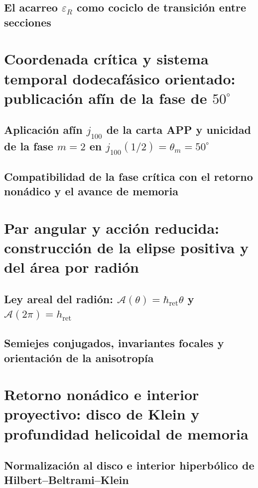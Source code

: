 \subsection{El acarreo \(\varepsilon_R\) como cociclo de transición entre secciones}


\section{Coordenada crítica y sistema temporal dodecafásico orientado: publicación afín de la fase de \(50^\circ\)}
\subsection{Aplicación afín \(j_{100}\) de la carta APP y unicidad de la fase \(m=2\) en \(j_{100}(1/2)=\theta_m=50^\circ\)}

\subsection{Compatibilidad de la fase crítica con el retorno nonádico y el avance de memoria}


\section{Par angular y acción reducida: construcción de la elipse positiva y del área por radión}
\subsection{Ley areal del radión: \(\mathcal A(\theta)=\hbar_{\mathrm{ret}}\theta\) y \(\mathcal A(2\pi)=h_{\mathrm{ret}}\)}

\subsection{Semiejes conjugados, invariantes focales y orientación de la anisotropía}


\section{Retorno nonádico e interior proyectivo: disco de Klein y profundidad helicoidal de memoria}
\subsection{Normalización al disco e interior hiperbólico de Hilbert--Beltrami--Klein}

